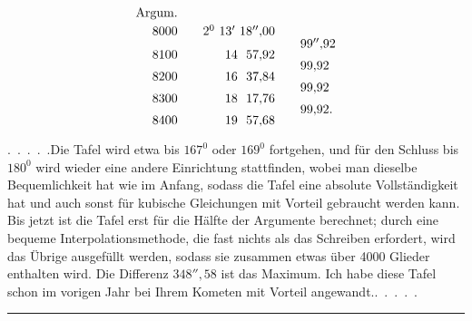 \[
\renewcommand{\arraystretch}{.65}
\begin{array}{r@{\qquad}r@{\qquad}l}
\text{Argum.}&&\\[4pt]
8000&2^0\ 13'\ 18''{,}00&\\
&&99''{,}92\\
8100&14\ \ 57{,}92&\\
&&99{,}92\\
8200&16\ \ 37{,}84&\\
&&99{,}92\\
8300&18\ \ 17{,}76&\\
&&99{,}92.\\
8400&19\ \ 57{,}68&
\end{array}
\]
\par
{}
\noindent\hspace*{\parindent}.\ .\ .\ .\ .\quad Die Tafel wird etwa bis \(167^0\) oder \(169^0\) fortgehen, und für den Schluss bis \(180^0\) wird wieder eine andere Einrichtung stattfinden, wobei man dieselbe Bequemlichkeit hat wie im Anfang, sodass die Tafel eine absolute Vollständigkeit hat und auch sonst für kubische Gleichungen mit Vorteil gebraucht werden kann. Bis jetzt ist die Tafel erst für die Hälfte der Argumente berechnet; durch eine bequeme Interpolationsmethode, die fast nichts als das Schreiben erfordert, wird das Übrige ausgefüllt werden, sodass sie zusammen etwas über 4000 Glieder enthalten wird. Die Differenz \(348''{,}58\) ist das Maximum. Ich habe diese Tafel schon im vorigen Jahr bei Ihrem Kometen mit Vorteil angewandt.\quad .\ .\ .\ .\ .
\par\medskip
\begin{center}\rule{.22\textwidth}{.4pt}\end{center}
\endgroup
